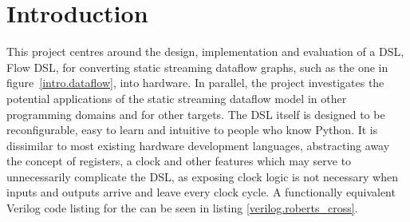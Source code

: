 \chapter{Introduction}
This project centres around the design, implementation and evaluation of a DSL, Flow DSL, for converting static streaming dataflow graphs, such as the one in figure \ref{intro.dataflow}, into hardware. In parallel, the project investigates the potential applications of the static streaming dataflow model in other programming domains and for other targets. The DSL itself is designed to be reconfigurable, easy to learn and intuitive to people who know Python. It is dissimilar to most existing hardware development languages, abstracting away the concept of registers, a clock and other features which may serve to unnecessarily complicate the DSL, as exposing clock logic is not necessary when inputs and outputs arrive and leave every clock cycle. A functionally equivalent Verilog code listing for the can be seen in listing \ref{verilog.roberts_cross}.

